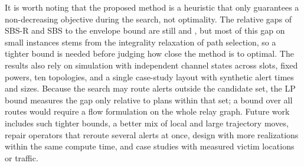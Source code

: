 It is worth noting that the proposed method is a heuristic that only guarantees a non-decreasing objective during the search, not optimality. The relative gaps of SBS-R and SBS to the envelope bound are still \ResultTwoUnionGapVzeroP{} and \ResultTwoUnionGapVzeroBtwo, but most of this gap on small instances stems from the integrality relaxation of path selection, so a tighter bound is needed before judging how close the method is to optimal. The results also rely on simulation with independent channel states across slots, fixed powers, ten topologies, and a single case-study layout with synthetic alert times and sizes. Because the search may route alerts outside the candidate set, the LP bound measures the gap only relative to plans within that set; a bound over all routes would require a flow formulation on the whole relay graph. Future work includes such tighter bounds, a better mix of local and large trajectory moves, repair operators that reroute several alerts at once, design with more realizations within the same compute time, and case studies with measured victim locations or traffic.

